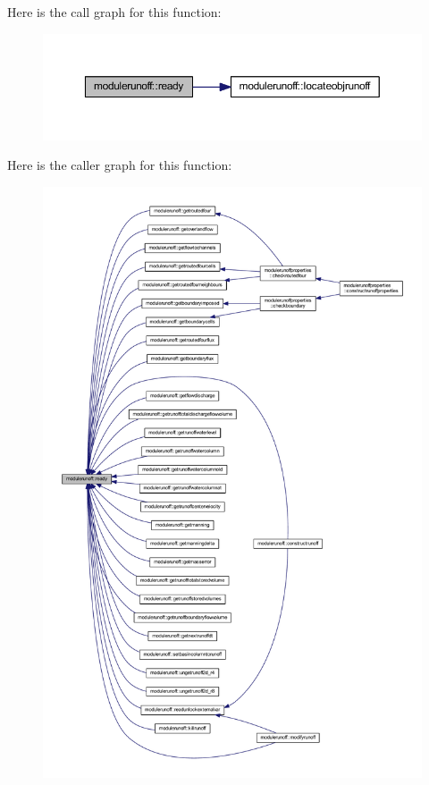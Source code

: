 Here is the call graph for this function\+:
\nopagebreak
\begin{figure}[H]
\begin{center}
\leavevmode
\includegraphics[width=350pt]{namespacemodulerunoff_aee0c5b22d517afda2e934847c9da42cb_cgraph}
\end{center}
\end{figure}
Here is the caller graph for this function\+:
\nopagebreak
\begin{figure}[H]
\begin{center}
\leavevmode
\includegraphics[width=350pt]{namespacemodulerunoff_aee0c5b22d517afda2e934847c9da42cb_icgraph}
\end{center}
\end{figure}
\mbox{\label{namespacemodulerunoff_a0a2296b090b1a35c74f3a4c0e35ad401}} 
